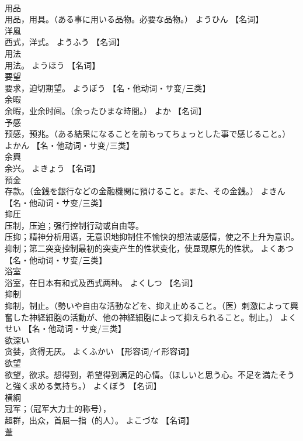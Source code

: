 \documentclass[8pt]{extreport}
\begin{document}
\begin{CJK}{UTF8}{min}
\\	用品	
\\	用品，用具。（ある事に用いる品物。必要な品物。）	ようひん		【名词】
\\	洋風	
\\	西式，洋式。	ようふう		【名词】
\\	用法	
\\	用法。	ようほう		【名词】
\\	要望	
\\	要求，迫切期望。	ようぼう		【名・他动词・サ变/三类】
\\	余暇	
\\	余暇，业余时间。（余ったひまな時間。）	よか		【名词】
\\	予感	
\\	预感，预兆。（ある結果になることを前もってちょっとした事で感じること。）	よかん		【名・他动词・サ变/三类】
\\	余興	
\\	余兴。	よきょう		【名词】
\\	預金	
\\	存款。（金銭を銀行などの金融機関に預けること。また、その金銭。）	よきん		【名・他动词・サ变/三类】
\\	抑圧	
\\	压制，压迫；强行控制行动或自由等。 
\\	压抑；精神分析用语，无意识地抑制住不愉快的想法或感情，使之不上升为意识。 
\\	抑制；第二突变控制最初的突变产生的性状变化，使显现原先的性状。	よくあつ		【名・他动词・サ变/三类】
\\	浴室	
\\	浴室，在日本有和式及西式两种。	よくしつ		【名词】
\\	抑制	
\\	抑制，制止。（勢いや自由な活動などを、抑え止めること。（医）刺激によって興奮した神経細胞の活動が、他の神経細胞によって抑えられること。制止。）	よくせい		【名・他动词・サ变/三类】
\\	欲深い	
\\	贪婪，贪得无厌。	よくふかい		【形容词/イ形容词】
\\	欲望	
\\	欲望，欲求。想得到，希望得到满足的心情。（ほしいと思う心。不足を満たそうと強く求める気持ち。）	よくぼう		【名词】
\\	横綱	
\\	冠军；（冠军大力士的称号）， 
\\	超群，出众，首屈一指（的人）。	よこづな		【名词】
\\	葦	

\end{CJK}
\end{document}

